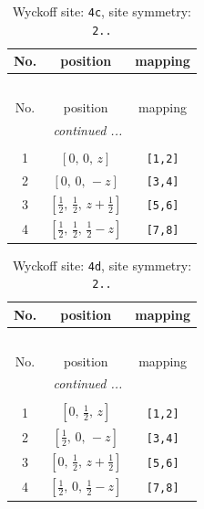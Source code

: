 \documentclass[fleqn,8pt]{jsarticle}
\begin{document}
\renewcommand{\arraystretch}{1.2}
\begin{longtable}{ccc}
\caption{Wyckoff site: {\tt 4c}, site symmetry: {\tt 2..}}
 \\
 \hline \hline
No. & position & mapping \\ \hline \endfirsthead

\multicolumn{2}{l}{\tablename\ \thetable{}} \\
 \hline \hline
No. & position & mapping \\ \hline \endhead

 \hline \hline
\multicolumn{2}{r}{\footnotesize\it continued ...} \\ \endfoot

 \hline \hline
\multicolumn{2}{r}{} \\ \endlastfoot

1 & $\left[ 0,\, 0,\, z \right]$ & {\tt [1,2]} \\ \hline
2 & $\left[ 0,\, 0,\, - z \right]$ & {\tt [3,4]} \\ \hline
3 & $\left[ \frac{1}{2},\, \frac{1}{2},\, z + \frac{1}{2} \right]$ & {\tt [5,6]} \\ \hline
4 & $\left[ \frac{1}{2},\, \frac{1}{2},\, \frac{1}{2} - z \right]$ & {\tt [7,8]} \\
\end{longtable}
\renewcommand{\arraystretch}{1.2}
\begin{longtable}{ccc}
\caption{Wyckoff site: {\tt 4d}, site symmetry: {\tt 2..}}
 \\
 \hline \hline
No. & position & mapping \\ \hline \endfirsthead

\multicolumn{2}{l}{\tablename\ \thetable{}} \\
 \hline \hline
No. & position & mapping \\ \hline \endhead

 \hline \hline
\multicolumn{2}{r}{\footnotesize\it continued ...} \\ \endfoot

 \hline \hline
\multicolumn{2}{r}{} \\ \endlastfoot

1 & $\left[ 0,\, \frac{1}{2},\, z \right]$ & {\tt [1,2]} \\ \hline
2 & $\left[ \frac{1}{2},\, 0,\, - z \right]$ & {\tt [3,4]} \\ \hline
3 & $\left[ 0,\, \frac{1}{2},\, z + \frac{1}{2} \right]$ & {\tt [5,6]} \\ \hline
4 & $\left[ \frac{1}{2},\, 0,\, \frac{1}{2} - z \right]$ & {\tt [7,8]} \\
\end{longtable}
\end{document}
